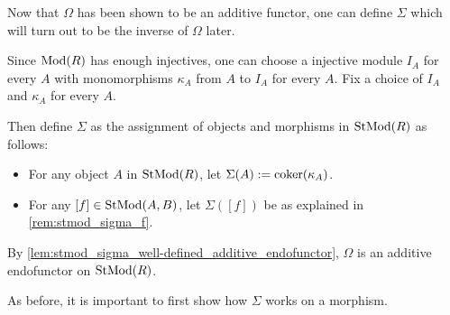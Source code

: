Now that \( \Omega \) has been shown to be an additive functor, one can define \( \Sigma \) which will turn out to be the inverse of \( \Omega \) later.

\begin{definition}
    \label{def:stmod_sigma}
    Since \( \operatorname{Mod}(R) \) has enough injectives, one can choose a injective module \( I_A \) for every \( A \) with monomorphisms \( \kappa_A \) from \( A \) to \( I_A \) for every \( A \). Fix a choice of \( I_A \) and \( \kappa_A \) for every \( A \).

    Then define \( \Sigma \) as the assignment of objects and morphisms in \( \operatorname{StMod}(R) \) as follows:
    \begin{itemize}
        \item For any object \( A \) in \( \operatorname{StMod}(R) \), let \( \Sigma(A) := \operatorname{coker}(\kappa_A) \).
        \item For any \( [f] \in \operatorname{StMod}(A, B) \), let \( \Sigma([f]) \) be as explained in \autoref{rem:stmod_sigma_f}.
    \end{itemize}

    By \autoref{lem:stmod_sigma_well-defined_additive_endofunctor}, \( \Omega \) is an additive endofunctor on \( \operatorname{StMod}(R) \).
\end{definition}

As before, it is important to first show how \( \Sigma \) works on a morphism.

